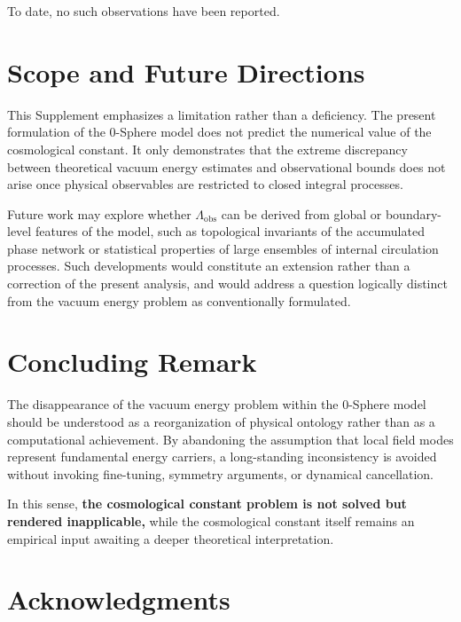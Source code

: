 \documentclass[12pt,letterpaper]{article}
\begin{document}
To date, no such observations have been reported.


\section{Scope and Future Directions}

This Supplement emphasizes a limitation rather than a deficiency. The present formulation of the 0-Sphere model does not predict the numerical value of the cosmological constant. It only demonstrates that the extreme discrepancy between theoretical vacuum energy estimates and observational bounds does not arise once physical observables are restricted to closed integral processes.

Future work may explore whether $\Lambda_{\mathrm{obs}}$ can be derived from global or boundary-level features of the model, such as topological invariants of the accumulated phase network or statistical properties of large ensembles of internal circulation processes. Such developments would constitute an extension rather than a correction of the present analysis, and would address a question logically distinct from the vacuum energy problem as conventionally formulated.

\section{Concluding Remark}

The disappearance of the vacuum energy problem within the 0-Sphere model should be understood as a reorganization of physical ontology rather than as a computational achievement. By abandoning the assumption that local field modes represent fundamental energy carriers, a long-standing inconsistency is avoided without invoking fine-tuning, symmetry arguments, or dynamical cancellation.

In this sense, \textbf{the cosmological constant problem is not solved but rendered inapplicable,} while the cosmological constant itself remains an empirical input awaiting a deeper theoretical interpretation.

\section*{Acknowledgments}
\end{document}
